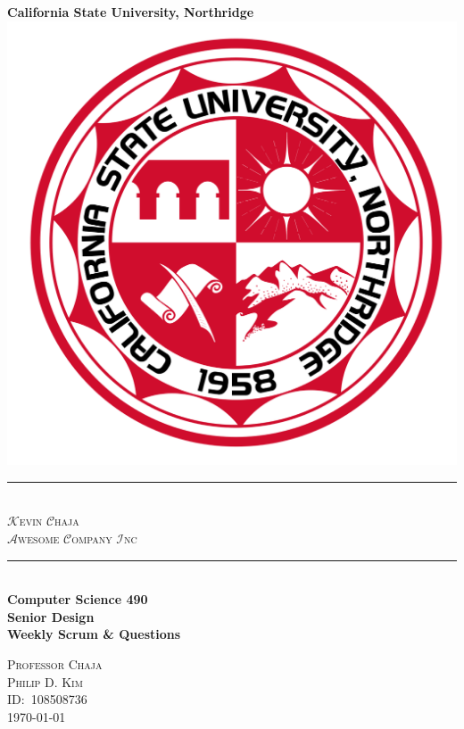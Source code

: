 \begin{titlepage}
  \newcommand{\HRule}{\rule{\linewidth}{0.5mm}}
  \center\Huge\textbf{California State University, Northridge}\\[1cm]
  \includegraphics[scale=0.1]{CSUNS.svg.png}\\[1cm]
  \HRule\  \\[0.4cm]
  {\huge\textsc{\(\mathcal{K}\)evin \(\mathcal{C}\)haja\\ \(\mathcal{A}\)wesome \(\mathcal{C}\)ompany \(\mathcal{I}\)nc}\,\texttrademark}\\[0.4cm]
  \HRule\  \\[2.4cm]
  \Large\textbf{Computer Science 490\\Senior Design}\\[0.2cm]
  \normalsize\textbf{Weekly Scrum \& Questions}
  \vfill
  \begin{minipage}{0.4\textwidth}
  \large\centering
  \textsc{Professor Chaja}\\
  \textsc{Philip D. Kim}\\
  \textsc{ID:\ 108508736}\\
  \textsc{\today}
  \end{minipage}
\end{titlepage}